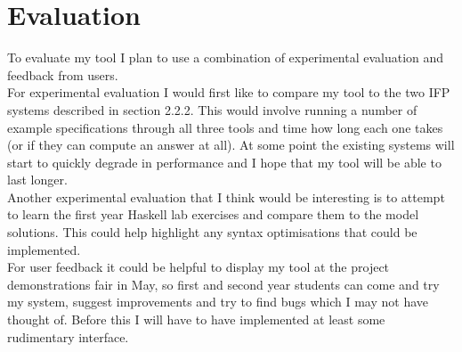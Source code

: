 \section{Evaluation}

To evaluate my tool I plan to use a combination of experimental evaluation and feedback from users.\\

For experimental evaluation I would first like to compare my tool to the two IFP systems described in section 2.2.2. This would involve running a number of example specifications through all three tools and time how long each one takes (or if they can compute an answer at all). At some point the existing systems will start to quickly degrade in performance and I hope that my tool will be able to last longer. \\
Another experimental evaluation that I think would be interesting is to attempt to learn the first year Haskell lab exercises and compare them to the model solutions. This could help highlight any syntax optimisations that could be implemented.\\

For user feedback it could be helpful to display my tool at the project demonstrations fair in May, so first and second year students can come and try my system, suggest improvements and try to find bugs which I may not have thought of. Before this I will have to have implemented at least some rudimentary interface.

\pagebreak
\renewcommand\bibname{{References}}


